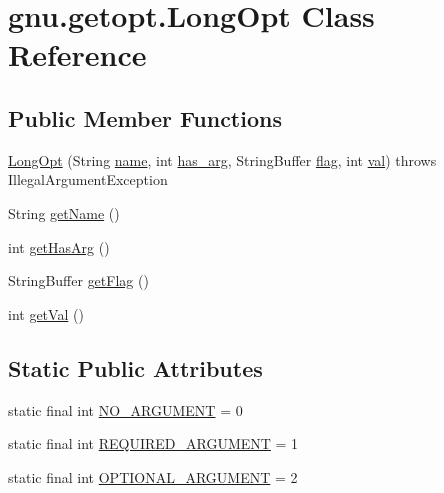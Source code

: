\hypertarget{classgnu_1_1getopt_1_1_long_opt}{
\section{gnu.getopt.LongOpt Class Reference}
\label{classgnu_1_1getopt_1_1_long_opt}
}
\subsection*{Public Member Functions}
\begin{DoxyCompactItemize}
\item 
\hyperlink{classgnu_1_1getopt_1_1_long_opt_a892ee836aff32542885ed3ddebb9d200}{LongOpt} (String \hyperlink{classgnu_1_1getopt_1_1_long_opt_a4b2a1686f77ce6aa2e36673cf0b074d9}{name}, int \hyperlink{classgnu_1_1getopt_1_1_long_opt_a7a8d529950461c0c30ef2df667df017b}{has\_\-arg}, StringBuffer \hyperlink{classgnu_1_1getopt_1_1_long_opt_ac9a762144573588ca158d909f65c03e9}{flag}, int \hyperlink{classgnu_1_1getopt_1_1_long_opt_aee56b4420df0cbd0f69788c7e4a3c57a}{val})  throws IllegalArgumentException 
\item 
String \hyperlink{classgnu_1_1getopt_1_1_long_opt_aaf2cc9e16562be40d61ee198095acb1c}{getName} ()
\item 
int \hyperlink{classgnu_1_1getopt_1_1_long_opt_a47d787d8b93010494fa587a7062328f0}{getHasArg} ()
\item 
StringBuffer \hyperlink{classgnu_1_1getopt_1_1_long_opt_ae10f9ea7c229f50fa58725d55c4e866f}{getFlag} ()
\item 
int \hyperlink{classgnu_1_1getopt_1_1_long_opt_ac03e7c48cc3baa3ca7bef7cddbc0fde7}{getVal} ()
\end{DoxyCompactItemize}
\subsection*{Static Public Attributes}
\begin{DoxyCompactItemize}
\item 
static final int \hyperlink{classgnu_1_1getopt_1_1_long_opt_a5af856e8de6a5f528d4da2b8706f7abe}{NO\_\-ARGUMENT} = 0
\item 
static final int \hyperlink{classgnu_1_1getopt_1_1_long_opt_a8105c98436b46a0b4de39a3afab230c2}{REQUIRED\_\-ARGUMENT} = 1
\item 
static final int \hyperlink{classgnu_1_1getopt_1_1_long_opt_a31819aae074fa1d80f547817640b31c1}{OPTIONAL\_\-ARGUMENT} = 2
\end{DoxyCompactItemize}
